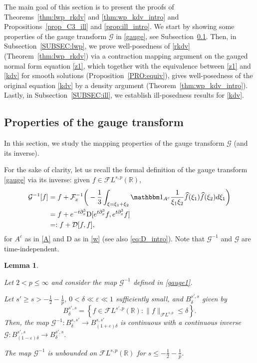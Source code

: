 \documentclass[a4paper,
11pt,  reqno]{amsart}
\newcommand{\5}{\textup{V}}
\newcommand{\noi}{\noindent}
\newcommand{\FL}{\mathcal{F} L}
\newcommand{\ft}{\widehat}
\newcommand{\ind}{\mathbbm 1}
\newcommand{\dl}{\delta}
\newcommand{\eps}{\varepsilon}
\newcommand{\dx}{\partial_x}
\newtheorem{lemma}[theorem]{Lemma}
\theoremstyle{remark}
\newcommand{\R}{\mathbb{R}}
\newcommand{\Ft}{{\mathcal{F}}}
\newcommand{\Gc}{\mathcal{G}}
\numberwithin{equation}{section}
\numberwithin{theorem}{section}
\newcommand{\D}{\mathrm{D}}
\newcommand{\DD}{\mathcal{D}}
\begin{document}
The main goal of this section is to present the proofs of Theorems~\ref{thm:lwp_rkdv} and \ref{thm:wp_kdv_intro} and Propositions~\ref{prop_C3_ill} and \ref{prop:ill_intro}.
We start by showing some properties of the gauge transform $\Gc$ in \eqref{gauge}, see Subsection~\ref{sec:gauge_prop}.
Then, in Subsection~\ref{SUBSEC:lwp}, we prove well-posedness of \eqref{rkdv} (Theorem~\ref{thm:lwp_rkdv}) via a contraction mapping argument on the gauged normal form equation \eqref{z1}, which together with the equivalence between \eqref{z1} and \eqref{kdv} for smooth solutions (Proposition~\ref{PRO:equiv}), gives well-posedness of the original equation \eqref{kdv} by a density argument (Theorem~\ref{thm:wp_kdv_intro}).
Lastly, in Subsection~\ref{SUBSEC:ill}, we establish ill-posedness results for \eqref{kdv}.




\subsection{Properties of the gauge transform}\label{sec:gauge_prop}
In this section, we study the mapping properties of the gauge transform $\Gc$ (and its inverse).

For the sake of clarity, let us recall the formal definition of the gauge transform \eqref{gauge} via its inverse: given
$f \in \FL^{s,p}(\R)$,
\begin{align}\label{gauge1}
    \Gc^{-1}[f]
    &
    = f + \Ft_x^{-1}\bigg( - \frac{1}{3} \int_{\xi=\xi_1+\xi_2} \ind_{A^c} \frac{1}{\xi_1\xi_2} \ft{f}(\xi_1) \ft{f}(\xi_2) d\xi_1 \bigg)\\&=f + e^{-t\dx^3} \D[e^{t\dx^3} f , e^{t\dx^3}f]
    \\
    &
     =: f + \DD [f, f]
    ,
\end{align}
for $A^c$ as in \eqref{A} and $\D$ as in \eqref{w} (see also \eqref{eq:D_intro}).
Note that $\Gc^{-1}$ and  $\Gc$ are time-independent.



\begin{lemma}\label{LEM:D}

Let $2<p\le \infty$ and consider the map  $\Gc^{-1}$ defined in \eqref{gauge1}.

\smallskip



\noi {\rm(i)}
Let $s' \ge s>-\frac12 - \frac1p$, $0<\dl\ll \eps \ll1$ sufficiently small, and $B_{\dl}^{s',s}$ given by
\begin{equation}
\label{Bss}
B^{s',s}_\delta=\left\{ f\in \FL^{s',p}(\R): \|f\|_{\FL^{s,p}} \le \delta \right\}.
\end{equation}
Then, the map $\Gc^{-1}: B^{s, s'}_\dl \to B^{s,s'}_{(1+\eps)\dl}$ is continuous with a continuous inverse $\Gc: B^{s',s}_{(1-\eps)\dl} \to B^{s',s}_\dl$.

\smallskip
\noi {\rm(ii)} The map $\Gc^{-1}$ is unbounded on $\FL^{s,p}(\R)$ for $s\le - \frac12 - \frac1p$.


\end{lemma}
\end{document}
